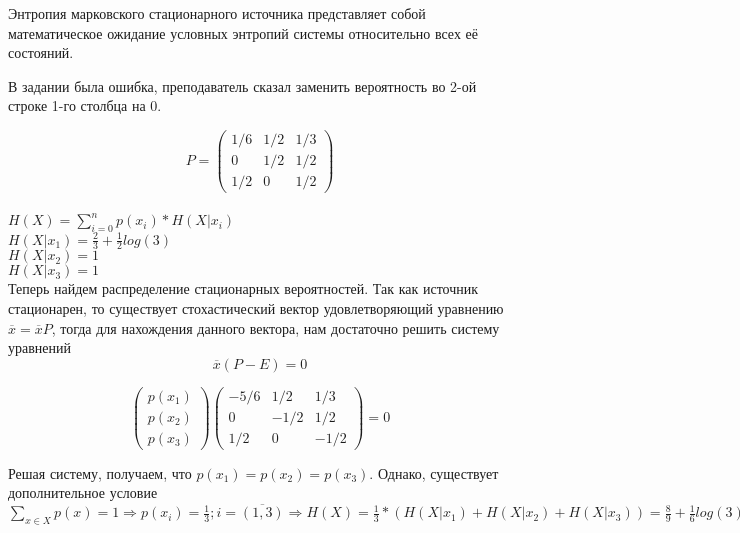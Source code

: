 \documentclass[../main.tex]{subfiles}
\begin{document}
Энтропия марковского стационарного источника представляет собой математическое ожидание условных энтропий системы относительно всех её состояний.

В задании была ошибка, преподаватель сказал заменить вероятность во 2-ой строке 1-го столбца на 0.

\begin{equation*}
P=
\left(
   \begin{array}{ccc}
     1/6 & 1/2 & 1/3 \\
     0   & 1/2 & 1/2 \\
     1/2 & 0   & 1/2
\end{array}
\right)
\end{equation*} \\
$H(X) = \sum\limits_{i=0}^{n}p(x_i)*H(X|x_i)$ \\
$H(X|x_1) = \frac{2}{3} + \frac{1}{2}log(3)$ \\
$H(X|x_2) = 1$ \\
$H(X|x_3) = 1$ \\

Теперь найдем распределение стационарных вероятностей. Так как источник стационарен, то существует стохастический вектор удовлетворяющий уравнению $\overline{x}=\overline{x}P$, тогда для нахождения данного вектора, нам достаточно решить систему уравнений 
$$\overline{x}(P-E)=0$$ 

\begin{equation*} 
\left(
   \begin{array}{c}
     p(x_1)\\
     p(x_2)\\
     p(x_3)
\end{array}
\right) 
\left(
   \begin{array}{ccc}
     -5/6 & 1/2 & 1/3 \\
     0   & -1/2 & 1/2 \\
     1/2 & 0   & -1/2
\end{array}
\right) =0
\end{equation*}

Решая систему, получаем, что $p(x_1)=p(x_2)=p(x_3)$. Однако, существует дополнительное условие 
$\sum\limits_{x \in X}p(x) =1 \Rightarrow p(x_i)=\frac{1}{3}; i=\overline{(1,3)} \Rightarrow H(X) = \frac{1}{3}*(H(X|x_1)+H(X|x_2)+H(X|x_3)) = \frac{8}{9}+\frac{1}{6}log(3)$
\end{document}

